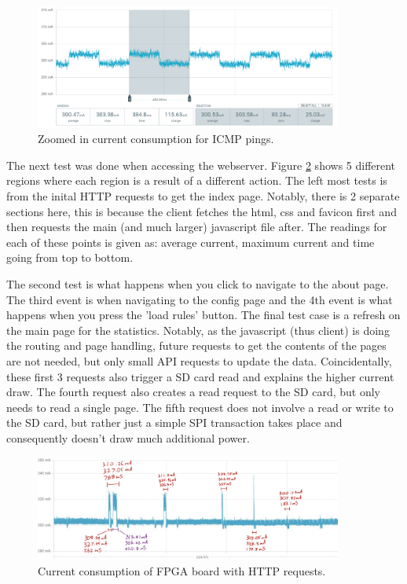 \begin{figure}[h]
    \centering
    \includegraphics[width=0.9\textwidth]{Images/PPK_ping_zoom.png}
    \caption[Zoomed in current consumption for ICMP pings]{Zoomed in current consumption for ICMP pings.}
    \label{fig:ppk_icmp_ping}
\end{figure}



The next test was done when accessing the webserver. Figure \ref{fig:ppk_http_annotated} shows 5 different regions where each region is a result of a different action. The left most tests is from the inital HTTP requests to get the index page. Notably, there is 2 separate sections here, this is because the client fetches the html, css and favicon first and then requests the main (and much larger) javascript file after. The readings for each of these points is given as: average current, maximum current and time going from top to bottom. 

The second test is what happens when you click to navigate to the about page. The third event is when navigating to the config page and the 4th event is what happens when you press the 'load rules' button. The final test case is a refresh on the main page for the statistics. Notably, as the javascript (thus client) is doing the routing and page handling, future requests to get the contents of the pages are not needed, but only small API requests to update the data. Coincidentally, these first 3 requests also trigger a SD card read and explains the higher current draw. The fourth request also creates a read request to the SD card, but only needs to read a single page. The fifth request does not involve a read or write to the SD card, but rather just a simple SPI transaction takes place and consequently doesn't draw much additional power. 

\begin{figure}[h]
    \centering
    \includegraphics[width=0.9\textwidth]{Images/PPK_http_annotated.png}
    \caption[Current consumption of FPGA board with HTTP requests]{Current consumption of FPGA board with HTTP requests.}
    \label{fig:ppk_http_annotated}
\end{figure}

